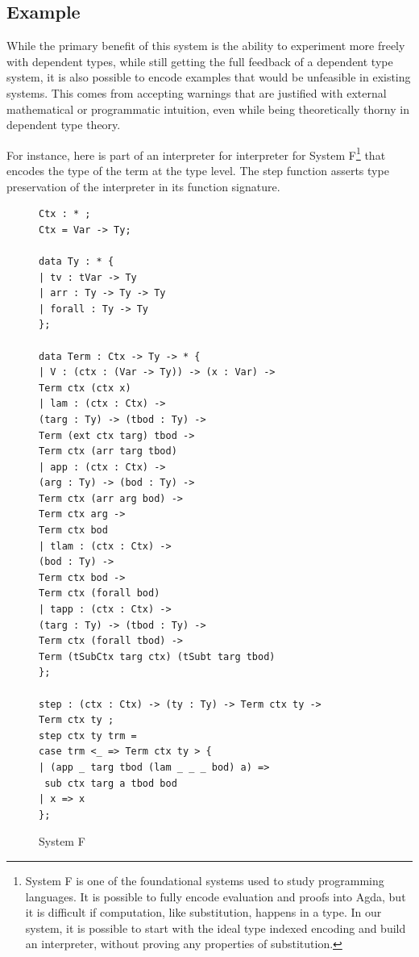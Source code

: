 \subsection{Example}

While the primary benefit of this system is the ability to experiment more freely with dependent types, while still getting the full feedback of a dependent type system, it is also possible to encode examples that would be unfeasible in existing systems.
This comes from accepting warnings that are justified with external mathematical or programmatic intuition, even while being theoretically thorny in dependent type theory.

For instance, here is part of an interpreter for interpreter for System F\footnote{
 System F is one of the foundational systems used to study programming languages.
 It is possible to fully encode evaluation and proofs into Agda, but it is difficult if computation, like substitution, happens in a type.
 In our system, it is possible to start with the ideal type indexed encoding and build an interpreter, without proving any properties of substitution.
} that encodes the type of the term at the type level.
The step function asserts type preservation of the interpreter in its function signature.

\begin{figure}
\begin{lstlisting}[basicstyle={\ttfamily\small}]
Ctx : * ;
Ctx = Var -> Ty;

data Ty : * {
| tv : tVar -> Ty
| arr : Ty -> Ty -> Ty
| forall : Ty -> Ty
};

data Term : Ctx -> Ty -> * {
| V : (ctx : (Var -> Ty)) -> (x : Var) ->
Term ctx (ctx x)
| lam : (ctx : Ctx) ->
(targ : Ty) -> (tbod : Ty) ->
Term (ext ctx targ) tbod ->
Term ctx (arr targ tbod)
| app : (ctx : Ctx) ->
(arg : Ty) -> (bod : Ty) ->
Term ctx (arr arg bod) ->
Term ctx arg ->
Term ctx bod
| tlam : (ctx : Ctx) ->
(bod : Ty) ->
Term ctx bod ->
Term ctx (forall bod)
| tapp : (ctx : Ctx) ->
(targ : Ty) -> (tbod : Ty) ->
Term ctx (forall tbod) ->
Term (tSubCtx targ ctx) (tSubt targ tbod)
};

step : (ctx : Ctx) -> (ty : Ty) -> Term ctx ty ->
Term ctx ty ;
step ctx ty trm =
case trm <_ => Term ctx ty > {
| (app _ targ tbod (lam _ _ _ bod) a) =>
 sub ctx targ a tbod bod
| x => x
};
\end{lstlisting}

\caption{System F}
\label{fig:ex-sysf}
\end{figure}

